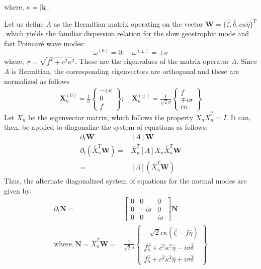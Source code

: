 where, $\kappa = |\mathbf{k}|$.

Let us define $A$ as the Hermitian matrix operating on the vector
$\mathbf{W} = \{\hat{\zeta}, \hat{\delta} ,c\kappa \hat{\eta} \}^T $.which
yields the
familiar dispersion relation
for the slow geostrophic mode
and fast Poincar\'e wave modes:
\begin{equation}
    \omega^{(0)} = 0;\quad \omega^{(\pm)}=\pm \sigma
\end{equation}
where, $\sigma = \sqrt{f^2 + c^2\kappa^2 }$. These are the eigenvalues of
the matrix operator \emph{A}. Since \emph{A} is Hermitian, the corresponding
eigenvectors are orthogonal and these are normalized as follows
\begin{align}
    \mathbf X^{(0)}_n =
    \frac{1}{\sigma}
    \begin{Bmatrix}
        -c\kappa \\ 0 \\ f
    \end{Bmatrix}; \quad
    \mathbf X^{(\pm)}_n =
    \frac{1}{\sqrt{2} \sigma}
    \begin{Bmatrix}
        f \\ \mp i\sigma \\ c\kappa
    \end{Bmatrix}
\end{align}
Let $X_n$ be the eigenvector matrix, which follows the
property $X_n \bar{X}_n^{T}=I$. It can, then, be applied to diagonalize the
system of
equations as follows:
\begin{align}
    \partial_t \mathbf{W} =               & [A] \mathbf{W}                    \\
    \partial_t (\bar{X}_n^T \mathbf{W}) = & \bar{X}_n^T[A]X_n
    \bar{X}_n^T\mathbf{W}                                                     \\
    =                                     & [\Lambda] (\bar{X}_n^T\mathbf{W})
\end{align}
Thus, the alternate diagonalized system of equations for the normal modes are
given by:
\begin{align}
    \partial_t
    \mathbf{N}
    = &
    \begin{bmatrix}
        0 & 0        & 0       \\
        0 & -i\sigma & 0       \\
        0 & 0        & i\sigma
    \end{bmatrix}
    \mathbf{N}                   \\
    \text{where},
    \mathbf{N} = \bar{X}_n^T \mathbf{W}
    = & \frac{1}{\sqrt{2}\sigma}
    \begin{Bmatrix}
        -\sqrt{2}c\kappa(\hat{\zeta} -f \hat{\eta})                \\
        f\hat{\zeta} + c^2\kappa^2\hat{\eta} - i\sigma\hat{\delta} \\
        f\hat{\zeta} + c^2\kappa^2\hat{\eta} + i\sigma\hat{\delta}
    \end{Bmatrix}
\end{align}

